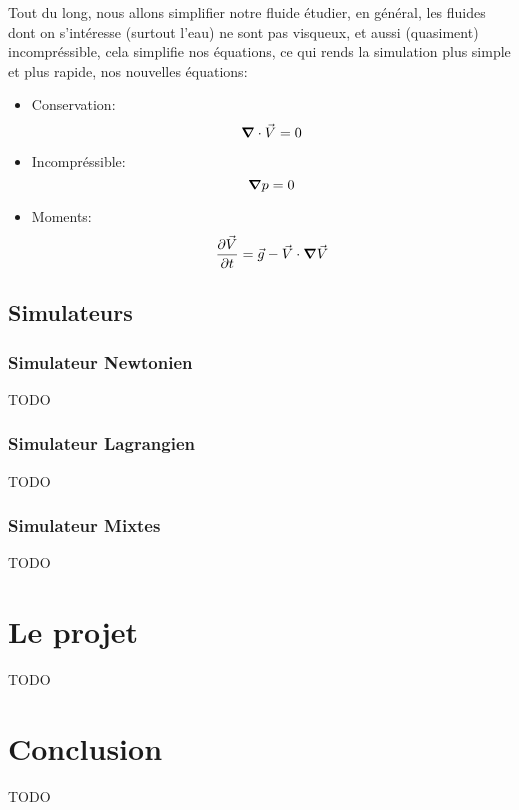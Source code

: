 \documentclass{article}
\begin{document}
Tout du long, nous allons simplifier notre fluide étudier, en général, les fluides dont on s'intéresse (surtout l'eau) ne sont pas visqueux, et aussi (quasiment) incompréssible, cela simplifie nos équations, ce qui rends la simulation plus simple et plus rapide, nos nouvelles équations:

\begin{itemize}
    \item Conservation:
        \[
            \grad \cdot \vec{V} = 0
        \]
    \item Incompréssible:
        \[
            \grad p = 0
        \]
    \item Moments:
        \[
            \pdv{\vec{V}}{t} = \vec{g} - \vec{V} \cdot \grad \vec{V}
        \]
\end{itemize}

\subsection{Simulateurs}
\subsubsection{Simulateur Newtonien}
TODO
\subsubsection{Simulateur Lagrangien}
TODO
\subsubsection{Simulateur Mixtes}
TODO

\section{Le projet}
TODO

\section{Conclusion}
TODO
\end{document}
